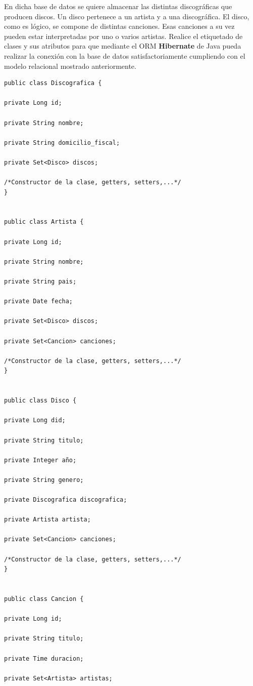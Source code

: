 \documentclass[
    12pt,
    a4paper,
    addpoints,
    answers,
    convocatoria=ord,
    titulacion=NoCD,
    curso=2022/2023,
]{db-exam}
\begin{document}
\begin{questions}
\begin{parts}
En dicha base de datos se quiere almacenar las distintas discográficas que producen discos. Un disco pertenece a un artista y a una discográfica. El disco, como es lógico, se compone de distintas canciones. Esas canciones a su vez pueden estar interpretadas por uno o varios artistas. Realice el etiquetado de clases y sus atributos para que mediante el ORM \textbf{Hibernate} de Java pueda realizar la conexión con la base de datos satisfactoriamente cumpliendo con el modelo relacional mostrado anteriormente.
\vspace{5mm}
    
\begin{verbatim}
public class Discografica {

private Long id;

private String nombre;

private String domicilio_fiscal;

private Set<Disco> discos;
    
/*Constructor de la clase, getters, setters,...*/
}

            
public class Artista {

private Long id;

private String nombre;

private String pais;

private Date fecha;

private Set<Disco> discos;

private Set<Cancion> canciones;
    
/*Constructor de la clase, getters, setters,...*/
}


public class Disco {

private Long did;

private String titulo;

private Integer año;

private String genero;

private Discografica discografica;

private Artista artista;

private Set<Cancion> canciones;

/*Constructor de la clase, getters, setters,...*/
}


public class Cancion {

private Long id;

private String titulo;

private Time duracion;

private Set<Artista> artistas;


\end{verbatim}
\end{parts}
\end{questions}
\end{document}
